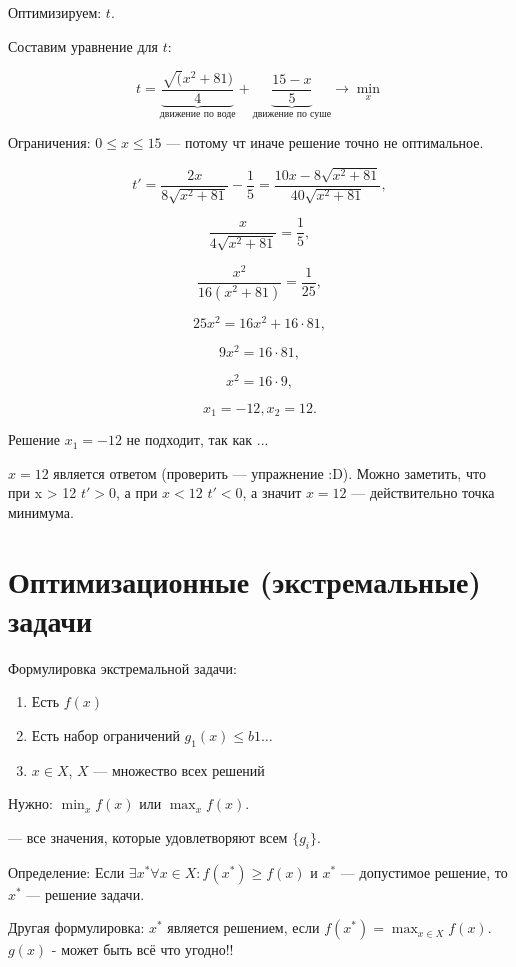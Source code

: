 Оптимизируем: $t$.

Составим уравнение для $t$:

\[
	t = \underbrace{\frac{\sqrt(x^2+81)}{4}}_{\text{движение по воде}} + \underbrace{\frac{15 - x}{5}}_{\text{движение по суше}} \to \min_x
\]

Ограничения: $0 \le x \le 15$ --- потому чт иначе решение точно не оптимальное.

\[t' = \frac{2x}{8\sqrt{x^2+81}} - \frac{1}{5} = \frac{10x - 8\sqrt{x^2+81}}{40\sqrt{x^2+81}},\]

\[\frac{x}{4\sqrt{x^2+81}} = \frac{1}{5},\]

\[\frac{x^2}{16(x^2 + 81)} = \frac{1}{25},\]

\[	25x^2 = 16x^2 + 16 \cdot 81,\]

\[9x^2 = 16 \cdot 81,\]

\[x^2 = 16 \cdot 9,\]

\[x_1 = -12, x_2 = 12.\]

Решение $x_1 = -12$ не подходит, так как ...

$x = 12$ является ответом (проверить --- упражнение :D). Можно заметить, что при x > 12 $t' > 0$, а при $x < 12$ $t' < 0$, а значит $x = 12$ --- действительно точка минимума.

\chapter{Оптимизационные (экстремальные) задачи}

Формулировка экстремальной задачи:

\begin{enumerate}
	\item Есть $f(x)$
	
	\item Есть набор ограничений $g_1(x) \le b1 \dots$
	
	\item $x \in X$, $X$ --- множество всех решений
\end{enumerate}

Нужно: $\min_x f(x)$ или $\max_x f(x)$.

 --- все значения, которые удовлетворяют всем $\{g_i\}$.

Определение: Если $\exists x^* \forall x \in X : f(x^*) \ge f(x)$ и $x^*$ --- допустимое решение, то $x^*$ --- решение задачи.

Другая формулировка: $x^*$ является решением, если $f(x^*) = \max_{x \in X} f(x)$. $g(x)$ - может быть всё что угодно!!

